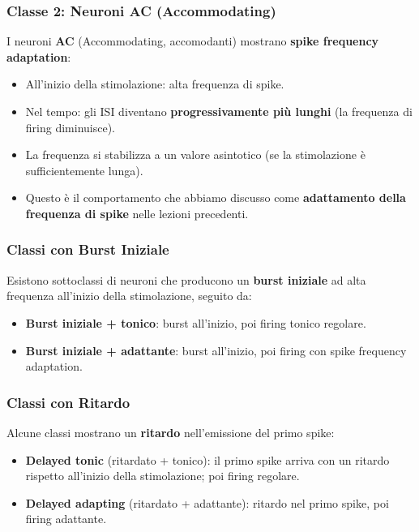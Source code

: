 \subsubsection{Classe 2: Neuroni AC (Accommodating)}

I neuroni \textbf{AC} (Accommodating, accomodanti) mostrano \textbf{spike frequency adaptation}:

\begin{itemize}
    \item All'inizio della stimolazione: alta frequenza di spike.
    \item Nel tempo: gli ISI diventano \textbf{progressivamente più lunghi} (la frequenza di firing diminuisce).
    \item La frequenza si stabilizza a un valore asintotico (se la stimolazione è sufficientemente lunga).
    \item Questo è il comportamento che abbiamo discusso come \textbf{adattamento della frequenza di spike} nelle lezioni precedenti.
\end{itemize}

\subsubsection{Classi con Burst Iniziale}

Esistono sottoclassi di neuroni che producono un \textbf{burst iniziale} ad alta frequenza all'inizio della stimolazione, seguito da:

\begin{itemize}
    \item \textbf{Burst iniziale + tonico}: burst all'inizio, poi firing tonico regolare.
    \item \textbf{Burst iniziale + adattante}: burst all'inizio, poi firing con spike frequency adaptation.
\end{itemize}

\subsubsection{Classi con Ritardo}

Alcune classi mostrano un \textbf{ritardo} nell'emissione del primo spike:

\begin{itemize}
    \item \textbf{Delayed tonic} (ritardato + tonico): il primo spike arriva con un ritardo rispetto all'inizio della stimolazione; poi firing regolare.
    \item \textbf{Delayed adapting} (ritardato + adattante): ritardo nel primo spike, poi firing adattante.
\end{itemize}


